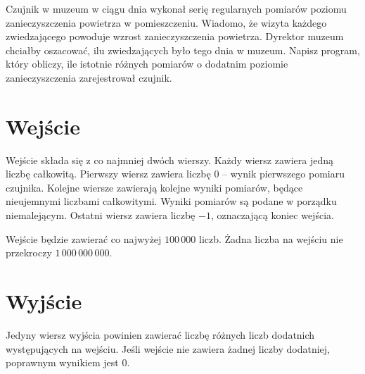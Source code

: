 \documentclass{spiral-kurs}
\begin{document}
\makeheader
%
    Czujnik w muzeum w ciągu dnia wykonał serię regularnych pomiarów
    poziomu zanieczyszczenia powietrza w pomieszczeniu.
    Wiadomo, że wizyta każdego zwiedzającego powoduje wzrost zanieczyszczenia powietrza.
    Dyrektor muzeum chciałby oszacować, ilu zwiedzających było tego dnia w muzeum.
    Napisz program, który obliczy, ile istotnie różnych pomiarów o dodatnim poziomie
    zanieczyszczenia zarejestrował czujnik.

    \section{Wejście}
    Wejście składa się z co najmniej dwóch wierszy.
    Każdy wiersz zawiera jedną liczbę całkowitą.
    Pierwszy wiersz zawiera liczbę 0 -- wynik pierwszego pomiaru czujnika.
    Kolejne wiersze zawierają kolejne wyniki pomiarów, będące
    nieujemnymi liczbami całkowitymi.
    Wyniki pomiarów są podane w porządku niemalejącym.
    Ostatni wiersz zawiera liczbę $-1$, oznaczającą koniec wejścia.

    Wejście będzie zawierać co najwyżej $100\,000$ liczb.
    Żadna liczba na wejściu nie przekroczy $1\,000\,000\,000$.

    \section{Wyjście}
    Jedyny wiersz wyjścia powinien zawierać liczbę różnych liczb dodatnich
    występujących na wejściu.
    Jeśli wejście nie zawiera żadnej liczby dodatniej, poprawnym wynikiem jest 0.



  
\end{document}
